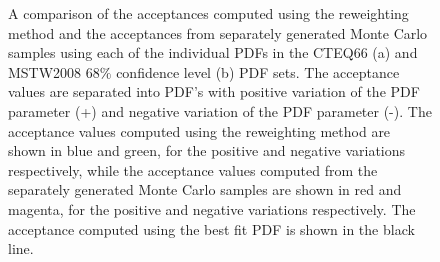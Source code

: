\documentclass{cmspaper}
\begin{document}
\begin{figure}[htb]
  \begin{center}
    \caption{A comparison of the acceptances computed using the reweighting method and the acceptances from separately generated Monte Carlo samples using each of the individual PDFs in the CTEQ66 (a) and MSTW2008 $68\%$ confidence level (b) PDF sets. The acceptance values are separated into PDF's with positive variation of the PDF parameter (+) and negative variation of the PDF parameter (-). The acceptance values computed using the reweighting method are shown in blue and green, for the positive and negative variations respectively, while the acceptance values computed from the separately generated Monte Carlo samples are shown in red and magenta, for the positive and negative variations respectively. The acceptance computed using the best fit PDF is shown in the black line. }
    \label{fig:PDFSystematicsReweightingMethod}
  \end{center}
\end{figure}
\end{document}
